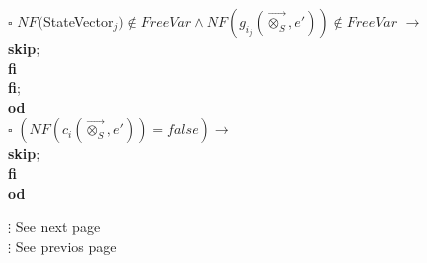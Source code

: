 \documentclass[a4paper,10pt]{article}
\theoremstyle{plain}
\theoremstyle{definition}
\newcommand{\ovr}{\overrightarrow}
\newcommand{\tb}{\textbf}
\newcommand{\ra}{$\rightarrow$}
\newcommand{\sq}{$\square$}
\begin{document}
\begin{tabbing}
  \>	\>	\>	\>	\>	  \>	\>	\sq 	\> $NF($StateVector$_j) \not\in FreeVar \wedge NF(g_{i_j}(\ovr{\otimes_S}, e')) \not\in FreeVar$ \ra \\
  \>	\>	\>	\>	\>	  \>	\>		\>	\>	\tb{skip};\\ 

 \>	\>	\>	\>	\>	\>	\>	\tb{fi}	\\

  \>	\>	\> 	\> 	\>          \tb{fi}; \\
  \>	\>	\>	\> \tb{od}\\
  \>	\>	\sq 	\>  $(NF(c_i(\ovr{\otimes_S},e')) = false) \rightarrow$ \\
  \>	\>	\> 	\>\tb{skip};\\
  \>	\>	\tb{fi}\\
  \>	\tb{od} \\
\end{tabbing}
$\vdots$ See next page\\
\newpage 
$\vdots$ See previos page\\
\end{document}
